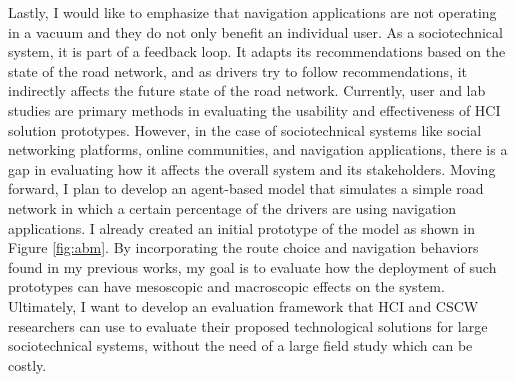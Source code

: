 Lastly, I would like to emphasize that navigation applications are not operating in a vacuum and they do not only benefit an individual user. As a sociotechnical system, it is part of a feedback loop. It adapts its recommendations based on the state of the road network, and as drivers try to follow recommendations, it indirectly affects the future state of the road network. Currently, user and lab studies are primary methods in evaluating the usability and effectiveness of HCI solution prototypes. However, in the case of sociotechnical systems like social networking platforms, online communities, and navigation applications, there is a gap in evaluating how it affects the overall system and its stakeholders. Moving forward, I plan to develop an agent-based model that simulates a simple road network in which a certain percentage of the drivers are using navigation applications. I already created an initial prototype of the model as shown in Figure \ref{fig:abm}. By incorporating the route choice and navigation behaviors found in my previous works, my goal is to evaluate how the deployment of such prototypes can have mesoscopic and macroscopic effects on the system. Ultimately, I want to develop an evaluation framework that HCI and CSCW researchers can use to evaluate their proposed technological solutions for large sociotechnical systems, without the need of a large field study which can be costly.